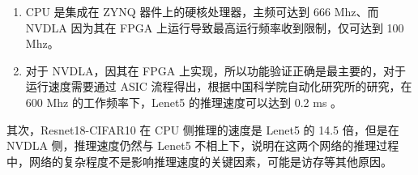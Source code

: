 \begin{enumerate}
    \item CPU 是集成在 ZYNQ 器件上的硬核处理器，主频可达到 666 Mhz、而 NVDLA 因为其在 FPGA 上运行导致最高运行频率收到限制，仅可达到 100 Mhz。
    \item 对于 NVDLA，因其在 FPGA 上实现，所以功能验证正确是最主要的，对于运行速度需要通过 ASIC 流程得出，根据中国科学院自动化研究所的研究，在 600 Mhz 的工作频率下，Lenet5 的推理速度可以达到 0.2 ms \cite{9040769}。 
\end{enumerate}

其次，Resnet18-CIFAR10 在 CPU 侧推理的速度是 Lenet5 的 14.5 倍，但是在 NVDLA 侧，推理速度仍然与 Lenet5 不相上下，说明在这两个网络的推理过程中，网络的复杂程度不是影响推理速度的关键因素，可能是访存等其他原因。